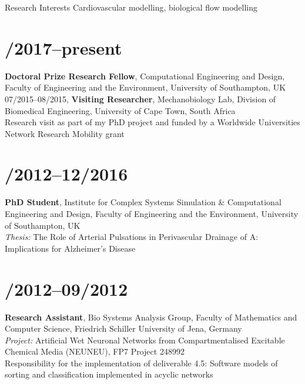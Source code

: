 \documentclass[margin,line]{res}
\begin{document}

\address{{\it E-Mail:} alexandra.diem@gmail.com, \url{https://www.akdiem.com}}

\begin{resume}

{\sc Research Interests} Cardiovascular modelling, biological flow modelling

\section{/2017--present}{\bf Doctoral Prize Research Fellow}, Computational Engineering and Design, Faculty of Engineering and the Environment, University of Southampton, UK\\
07/2015--08/2015, {\bf Visiting Researcher}, Mechanobiology Lab, Division of Biomedical Engineering, University of Cape Town, South Africa\\
Research visit as part of my PhD project and funded by a Worldwide Universities Network Research Mobility grant\\
\vspace*{-.35in}
\section{/2012--12/2016}{\bf PhD Student}, Institute for Complex Systems Simulation \& Computational Engineering and Design, Faculty of Engineering and the Environment, University of Southampton, UK\\
{\em Thesis:} The Role of Arterial Pulsations in Perivascular Drainage of A\textbeta: Implications for Alzheimer's Disease\\
\vspace*{-.35in}        
\section{/2012--09/2012}{\bf Research Assistant}, Bio Systems Analysis Group, Faculty of Mathematics and Computer Science, Friedrich Schiller University of Jena, Germany\\
{\em Project:} Artificial Wet Neuronal Networks from Compartmentalised Excitable Chemical Media (NEUNEU), FP7 Project 248992\\
Responsibility for the implementation of deliverable 4.5: Software models of sorting and classification implemented in acyclic networks\\
\vspace*{-.35in}

\end{resume}
\end{document}
